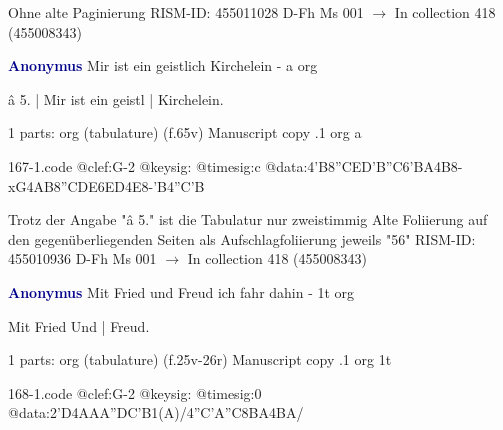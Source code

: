 \documentclass[twocolumn]{book}
\begin{document}
\newline Ohne alte Paginierung
\newline RISM-ID: 455011028
\newline D-Fh  Ms 001
\newline $\rightarrow$ In collection 418 (455008343)
      
\newline \par \vspace{7pt} \textcolor{darkblue}{\textbf{Anonymus  }}
\newline Mir ist ein geistlich Kirchelein - a
\newline org
\newline \begin{itshape}[f.65v, at left:] â 5. | Mir ist ein geistl | Kirchelein.\end{itshape} 
\newline \textcolor{darkblue}{}  1 parts: org (tabulature)  (f.65v)
\newline Manuscript copy
.1  org  a  
\begin{filecontents*}{167-1.code}
@clef:G-2
@keysig:
@timesig:c
@data:4'B{8''CE}{D'B''C6'BA}4B8-xG4AB{8''CDE6ED}4E8-'B4''C'B
\end{filecontents*}
\newline
%

\newline Trotz der Angabe "â 5." ist die Tabulatur nur zweistimmig
\newline Alte Foliierung auf den gegenüberliegenden Seiten als Aufschlagfoliierung jeweils "56"
\newline RISM-ID: 455010936
\newline D-Fh  Ms 001
\newline $\rightarrow$ In collection 418 (455008343)
      
\newline \par \vspace{7pt} \textcolor{darkblue}{\textbf{Anonymus  }}
\newline Mit Fried und Freud ich fahr dahin - 1t
\newline org
\newline \begin{itshape}[f.25v, at left:] Mit Fried Und | Freud.\end{itshape} 
\newline \textcolor{darkblue}{}  1 parts: org (tabulature)  (f.25v-26r)
\newline Manuscript copy
.1  org  1t  
\begin{filecontents*}{168-1.code}
@clef:G-2
@keysig:
@timesig:0
@data:2'D4AAA''DC'B1(A)/4''C'A''C{8BA}4BA/
\end{filecontents*}
\newline
%
\end{document}
